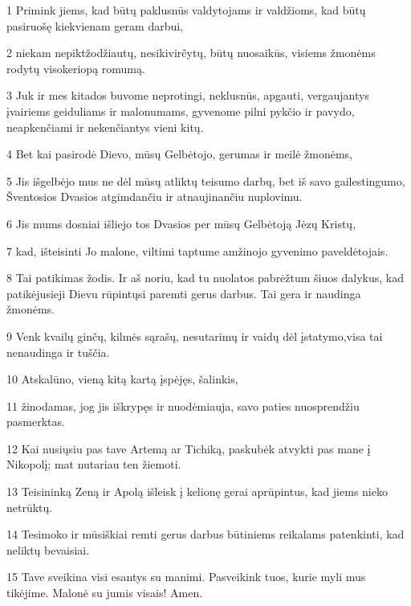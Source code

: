 \par 1 Primink jiems, kad būtų paklusnūs valdytojams ir valdžioms, kad būtų pasiruošę kiekvienam geram darbui, 
\par 2 niekam nepiktžodžiautų, nesikivirčytų, būtų nuosaikūs, visiems žmonėms rodytų visokeriopą romumą. 
\par 3 Juk ir mes kitados buvome neprotingi, neklusnūs, apgauti, vergaujantys įvairiems geiduliams ir malonumams, gyvenome pilni pykčio ir pavydo, neapkenčiami ir nekenčiantys vieni kitų. 
\par 4 Bet kai pasirodė Dievo, mūsų Gelbėtojo, gerumas ir meilė žmonėms, 
\par 5 Jis išgelbėjo mus ne dėl mūsų atliktų teisumo darbų, bet iš savo gailestingumo, Šventosios Dvasios atgimdančiu ir atnaujinančiu nuplovimu. 
\par 6 Jis mums dosniai išliejo tos Dvasios per mūsų Gelbėtoją Jėzų Kristų, 
\par 7 kad, išteisinti Jo malone, viltimi taptume amžinojo gyvenimo paveldėtojais. 
\par 8 Tai patikimas žodis. Ir aš noriu, kad tu nuolatos pabrėžtum šiuos dalykus, kad patikėjusieji Dievu rūpintųsi paremti gerus darbus. Tai gera ir naudinga žmonėms. 
\par 9 Venk kvailų ginčų, kilmės sąrašų, nesutarimų ir vaidų dėl įstatymo,­visa tai nenaudinga ir tuščia. 
\par 10 Atskalūno, vieną kitą kartą įspėjęs, šalinkis, 
\par 11 žinodamas, jog jis iškrypęs ir nuodėmiauja, savo paties nuosprendžiu pasmerktas. 
\par 12 Kai nusiųsiu pas tave Artemą ar Tichiką, paskubėk atvykti pas mane į Nikopolį; mat nutariau ten žiemoti. 
\par 13 Teisininką Zeną ir Apolą išleisk į kelionę gerai aprūpintus, kad jiems nieko netrūktų. 
\par 14 Tesimoko ir mūsiškiai remti gerus darbus būtiniems reikalams patenkinti, kad neliktų bevaisiai. 
\par 15 Tave sveikina visi esantys su manimi. Pasveikink tuos, kurie myli mus tikėjime. Malonė su jumis visais! Amen.


